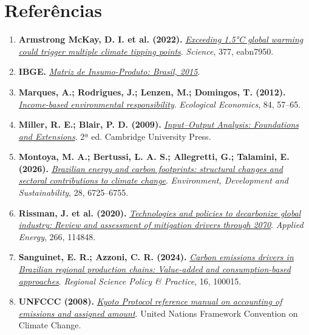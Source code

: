 \documentclass[12pt]{article}
\begin{document}
\section*{Referências}
\begin{enumerate}
\item \textbf{Armstrong McKay, D. I. et al. (2022).} \href{https://doi.org/10.1126/science.abn7950}{\textit{Exceeding 1.5°C global warming could trigger multiple climate tipping points}}. \textit{Science}, 377, eabn7950.

\item \textbf{IBGE.} \href{https://www.ibge.gov.br/estatisticas/economicas/contas-nacionais/9085-matriz-de-insumo-produto.html}{\textit{Matriz de Insumo-Produto: Brasil, 2015}}.

\item \textbf{Marques, A.; Rodrigues, J.; Lenzen, M.; Domingos, T. (2012).} \href{https://doi.org/10.1016/j.ecolecon.2012.09.010}{\textit{Income-based environmental responsibility}}. \textit{Ecological Economics}, 84, 57–65.

\item \textbf{Miller, R. E.; Blair, P. D. (2009).} \href{https://doi.org/10.1017/CBO9780511626982}{\textit{Input–Output Analysis: Foundations and Extensions}}. 2ª ed. Cambridge University Press.

\item \textbf{Montoya, M. A.; Bertussi, L. A. S.; Allegretti, G.; Talamini, E. (2026).} \href{https://doi.org/10.1007/s10668-024-05251-8}{\textit{Brazilian energy and carbon footprints: structural changes and sectoral contributions to climate change}}. \textit{Environment, Development and Sustainability}, 28, 6725–6755.

\item \textbf{Rissman, J. et al. (2020).} \href{https://doi.org/10.1016/j.apenergy.2020.114848}{\textit{Technologies and policies to decarbonize global industry: Review and assessment of mitigation drivers through 2070}}. \textit{Applied Energy}, 266, 114848.

\item \textbf{Sanguinet, E. R.; Azzoni, C. R. (2024).} \href{https://doi.org/10.1016/j.rspp.2024.100015}{\textit{Carbon emissions drivers in Brazilian regional production chains: Value-added and consumption-based approaches}}. \textit{Regional Science Policy \& Practice}, 16, 100015.

\item \textbf{UNFCCC (2008).} \href{https://unfccc.int/resource/docs/publications/08_unfccc_kp_ref_manual.pdf}{\textit{Kyoto Protocol reference manual on accounting of emissions and assigned amount}}. United Nations Framework Convention on Climate Change.

\end{enumerate}
\end{document}
